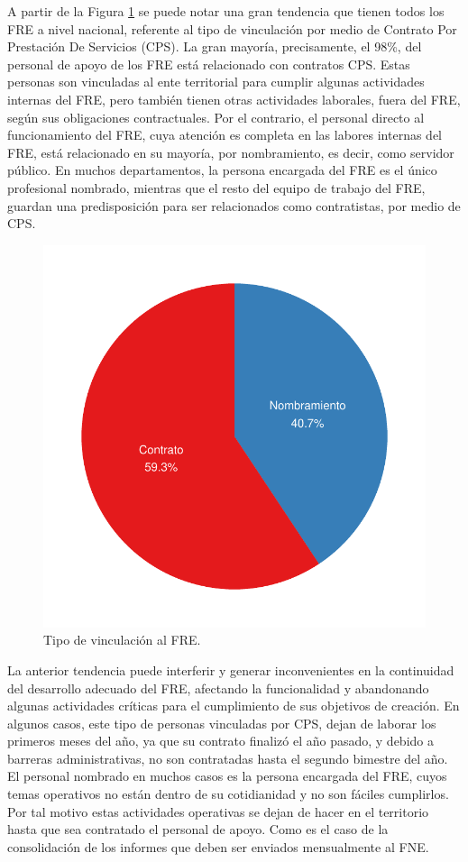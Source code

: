 \documentclass[
]{book}
\begin{document}
A partir de la Figura \ref{fig:pieProfesional2} se puede notar una gran tendencia que tienen todos los FRE a nivel nacional, referente al tipo de vinculación por medio de Contrato Por Prestación De Servicios (CPS). La gran mayoría, precisamente, el 98\%, del personal de apoyo de los FRE está relacionado con contratos CPS. Estas personas son vinculadas al ente territorial para cumplir algunas actividades internas del FRE, pero también tienen otras actividades laborales, fuera del FRE, según sus obligaciones contractuales. Por el contrario, el personal directo al funcionamiento del FRE, cuya atención es completa en las labores internas del FRE, está relacionado en su mayoría, por nombramiento, es decir, como servidor público. En muchos departamentos, la persona encargada del FRE es el único profesional nombrado, mientras que el resto del equipo de trabajo del FRE, guardan una predisposición para ser relacionados como contratistas, por medio de CPS.

\begin{figure}[t]

{\centering \includegraphics[width=0.85\linewidth]{InformeFinal_files/figure-latex/pieProfesional2-1} 

}

\caption{Tipo de vinculación al FRE.}\label{fig:pieProfesional2}
\end{figure}

La anterior tendencia puede interferir y generar inconvenientes en la continuidad del desarrollo adecuado del FRE, afectando la funcionalidad y abandonando algunas actividades críticas para el cumplimiento de sus objetivos de creación. En algunos casos, este tipo de personas vinculadas por CPS, dejan de laborar los primeros meses del año, ya que su contrato finalizó el año pasado, y debido a barreras administrativas, no son contratadas hasta el segundo bimestre del año. El personal nombrado en muchos casos es la persona encargada del FRE, cuyos temas operativos no están dentro de su cotidianidad y no son fáciles cumplirlos. Por tal motivo estas actividades operativas se dejan de hacer en el territorio hasta que sea contratado el personal de apoyo. Como es el caso de la consolidación de los informes que deben ser enviados mensualmente al FNE.
\end{document}

